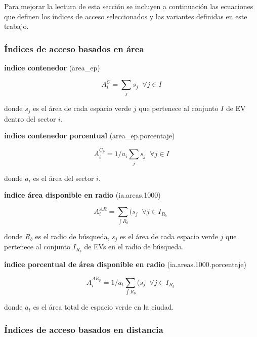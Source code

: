 \documentclass[12pt,]{book}
\begin{document}
Para mejorar la lectura de esta sección se incluyen a continuación las
ecuaciones que definen los índices de acceso seleccionados y las
variantes definidas en este trabajo.

\subsubsection*{Índices de acceso basados en
área}\label{indices-de-acceso-basados-en-area}

\textbf{índice contenedor} (area\_ep)

\begin{equation}
A^{C}_i =\sum_j{s_j} \;  \; \forall  j \in I
\label{eq:cont}
\end{equation}

donde \(s_j\) es el área de cada espacio verde \(j\) que pertenece al
conjunto \(I\) de EV dentro del sector \(i\).

\textbf{índice contenedor porcentual} (area\_ep.porcentaje)

\begin{equation}
A^{C_p}_i =1/a_i\sum_j{s_j} \;  \; \forall  j \in I
\label{eq:n-cont}
\end{equation}

donde \(a_i\) es el área del sector \(i\).

\textbf{índice área disponible en radio} (ia.areas.1000)

\begin{equation}
A^{AR}_i= \sum_{\int R_b }{(s_j}  \;  \; \forall  j \in I_{R_b} \; 
\label{eq:area-radio}
\end{equation}

donde \(R_b\) es el radio de búsqueda, \(s_j\) es el área de cada
espacio verde \(j\) que pertenece al conjunto \(I_{R_b}\) de EVs en el
radio de búsqueda.

\textbf{índice porcentual de área disponible en radio}
(ia.areas.1000.porcentaje)

\begin{equation}
A^{AR_p}_i= 1/a_t \sum_{\int R_b }{(s_j}  \;  \; \forall  j \in I_{R_b} \; 
\label{eq:area-radio2}
\end{equation}

donde \(a_t\) es el área total de espacio verde en la ciudad.

\subsubsection*{Índices de acceso basados en
distancia}\label{indices-de-acceso-basados-en-distancia}
\end{document}
